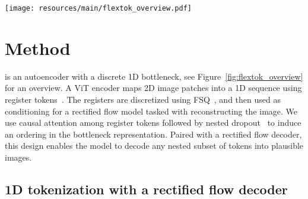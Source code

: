 \begin{figure*}[ht!]
\centering
\texttt{[image: resources/main/flextok\_overview.pdf]}
\caption{
\textbf{\ours overview.} \textbf{Stage 1}: \ours resamples 2D VAE latents to a 1D sequence of discrete tokens using a ViT with registers~\cite{Darcet2023Registers}. The FSQ-quantized bottleneck~\cite{mentzer2023fsq} representation is used to condition a rectified flow model that decodes and reconstructs the original images. \ours learns ordered token sequences of flexible length by applying nested dropout~\cite{Rippel2014NestedDropout} on the register tokens. 
\textbf{Stage 2}: We train class- and text-conditional autoregressive Transformers to predict 1D token sequences in a coarse-to-fine manner. As more tokens are predicted, the generated image becomes more specific, encoding high-level concepts first \textit{(e.g., presence of a car)} followed by finer details \textit{(e.g., car shape, brand, color)}.}
\label{fig:flextok_overview}
\vspace{-0.5em}
\end{figure*}

\section{Method}

\ours is an autoencoder with a discrete 1D bottleneck, see Figure~\ref{fig:flextok_overview} for an overview. A ViT encoder maps 2D image patches into a 1D sequence using register tokens~\cite{Darcet2023Registers, yu2024titok}. The registers are discretized using FSQ~\cite{mentzer2023fsq}, and then used as conditioning for a rectified flow model tasked with reconstructing the image. We use causal attention among register tokens followed by nested dropout~\cite{Rippel2014NestedDropout} to induce an ordering in the bottleneck representation. Paired with a rectified flow decoder, this design enables the model to decode any nested subset of tokens into plausible images.


\subsection{1D tokenization with a rectified flow decoder}

